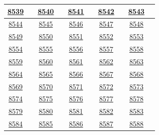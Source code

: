 \documentclass[11pt,a4paper]{article}
\newcommand{\en}[1]{\textenglish{#1}}
\begin{document}
{\begin{longtable}{|c|c||c|c||c|c||c|c||c|c|}
\hyperref[q8539]{\en{8539}} & \pageref{q8539} & \hyperref[q8540]{\en{8540}} & \pageref{q8540} & \hyperref[q8541]{\en{8541}} & \pageref{q8541} & \hyperref[q8542]{\en{8542}} & \pageref{q8542} & \hyperref[q8543]{\en{8543}} & \pageref{q8543}\\\hline
\hyperref[q8544]{\en{8544}} & \pageref{q8544} & \hyperref[q8545]{\en{8545}} & \pageref{q8545} & \hyperref[q8546]{\en{8546}} & \pageref{q8546} & \hyperref[q8547]{\en{8547}} & \pageref{q8547} & \hyperref[q8548]{\en{8548}} & \pageref{q8548}\\\hline
\hyperref[q8549]{\en{8549}} & \pageref{q8549} & \hyperref[q8550]{\en{8550}} & \pageref{q8550} & \hyperref[q8551]{\en{8551}} & \pageref{q8551} & \hyperref[q8552]{\en{8552}} & \pageref{q8552} & \hyperref[q8553]{\en{8553}} & \pageref{q8553}\\\hline
\hyperref[q8554]{\en{8554}} & \pageref{q8554} & \hyperref[q8555]{\en{8555}} & \pageref{q8555} & \hyperref[q8556]{\en{8556}} & \pageref{q8556} & \hyperref[q8557]{\en{8557}} & \pageref{q8557} & \hyperref[q8558]{\en{8558}} & \pageref{q8558}\\\hline
\hyperref[q8559]{\en{8559}} & \pageref{q8559} & \hyperref[q8560]{\en{8560}} & \pageref{q8560} & \hyperref[q8561]{\en{8561}} & \pageref{q8561} & \hyperref[q8562]{\en{8562}} & \pageref{q8562} & \hyperref[q8563]{\en{8563}} & \pageref{q8563}\\\hline
\hyperref[q8564]{\en{8564}} & \pageref{q8564} & \hyperref[q8565]{\en{8565}} & \pageref{q8565} & \hyperref[q8566]{\en{8566}} & \pageref{q8566} & \hyperref[q8567]{\en{8567}} & \pageref{q8567} & \hyperref[q8568]{\en{8568}} & \pageref{q8568}\\\hline
\hyperref[q8569]{\en{8569}} & \pageref{q8569} & \hyperref[q8570]{\en{8570}} & \pageref{q8570} & \hyperref[q8571]{\en{8571}} & \pageref{q8571} & \hyperref[q8572]{\en{8572}} & \pageref{q8572} & \hyperref[q8573]{\en{8573}} & \pageref{q8573}\\\hline
\hyperref[q8574]{\en{8574}} & \pageref{q8574} & \hyperref[q8575]{\en{8575}} & \pageref{q8575} & \hyperref[q8576]{\en{8576}} & \pageref{q8576} & \hyperref[q8577]{\en{8577}} & \pageref{q8577} & \hyperref[q8578]{\en{8578}} & \pageref{q8578}\\\hline
\hyperref[q8579]{\en{8579}} & \pageref{q8579} & \hyperref[q8580]{\en{8580}} & \pageref{q8580} & \hyperref[q8581]{\en{8581}} & \pageref{q8581} & \hyperref[q8582]{\en{8582}} & \pageref{q8582} & \hyperref[q8583]{\en{8583}} & \pageref{q8583}\\\hline
\hyperref[q8584]{\en{8584}} & \pageref{q8584} & \hyperref[q8585]{\en{8585}} & \pageref{q8585} & \hyperref[q8586]{\en{8586}} & \pageref{q8586} & \hyperref[q8587]{\en{8587}} & \pageref{q8587} & \hyperref[q8588]{\en{8588}} & \pageref{q8588}\\\hline

\end{longtable}}
\end{document}
